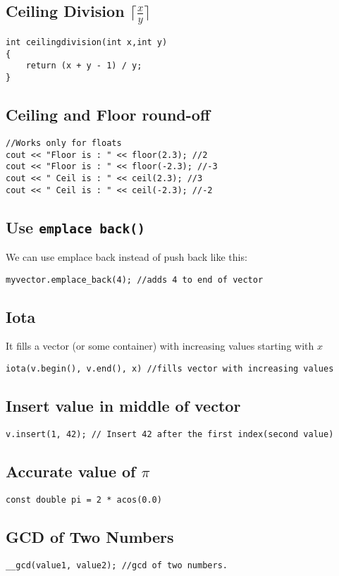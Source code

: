 \documentclass[twoside,12pt,a4paper,english]{book}
\theoremstyle{definition}
\theoremstyle{problemstyle}
\begin{document}
\subsection{Ceiling Division $\lceil \frac{x}{y} \rceil$}
\begin{lstlisting}
int ceilingdivision(int x,int y)
{
    return (x + y - 1) / y;
}
\end{lstlisting}
\subsection{Ceiling and Floor round-off}
\begin{lstlisting}
//Works only for floats
cout << "Floor is : " << floor(2.3); //2
cout << "Floor is : " << floor(-2.3); //-3
cout << " Ceil is : " << ceil(2.3); //3
cout << " Ceil is : " << ceil(-2.3); //-2
\end{lstlisting}
\subsection{Use \texttt{emplace back()}}
We can use emplace back instead of push back like this:
\begin{lstlisting}
myvector.emplace_back(4); //adds 4 to end of vector
\end{lstlisting}
\subsection{Iota}
It fills a vector (or some container) with increasing values starting with $x$
\begin{lstlisting}
iota(v.begin(), v.end(), x) //fills vector with increasing values
\end{lstlisting}
\subsection{Insert value in middle of vector}
\begin{lstlisting}
v.insert(1, 42); // Insert 42 after the first index(second value)
\end{lstlisting}
\subsection{Accurate value of $\pi$}
\begin{lstlisting}
const double pi = 2 * acos(0.0)
\end{lstlisting}
\subsection{GCD of Two Numbers}
\begin{lstlisting}
__gcd(value1, value2); //gcd of two numbers.
\end{lstlisting}
\end{document}
